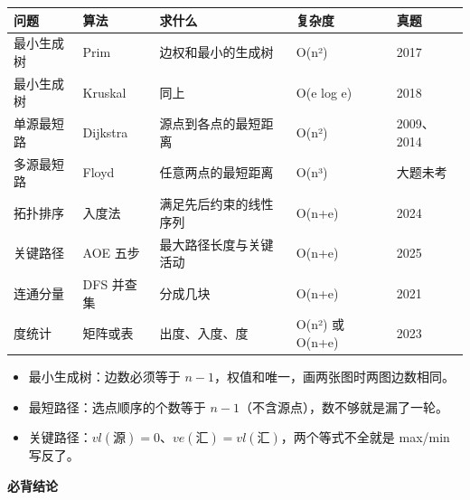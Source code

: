 \documentclass[10pt,a4paper]{ctexart}
\begin{document}
\begin{center}\small
\begin{tabularx}{\linewidth}{@{}ll>{\raggedright\arraybackslash}Xll@{}}
\toprule
问题 & 算法 & 求什么 & 复杂度 & 真题 \\
\midrule
最小生成树 & Prim & 边权和最小的生成树 & O(n²) & 2017 \\
最小生成树 & Kruskal & 同上 & O(e log e) & 2018 \\
单源最短路 & Dijkstra & 源点到各点的最短距离 & O(n²) & 2009、2014 \\
多源最短路 & Floyd & 任意两点的最短距离 & O(n³) & 大题未考 \\
拓扑排序 & 入度法 & 满足先后约束的线性序列 & O(n+e) & 2024 \\
关键路径 & AOE 五步 & 最大路径长度与关键活动 & O(n+e) & 2025 \\
连通分量 & DFS 并查集 & 分成几块 & O(n+e) & 2021 \\
度统计 & 矩阵或表 & 出度、入度、度 & O(n²) 或 O(n+e) & 2023 \\
\bottomrule
\end{tabularx}
\end{center}


\begin{itemize}

\item 最小生成树：边数必须等于 $n-1$，权值和唯一，画两张图时两图边数相同。

\item 最短路径：选点顺序的个数等于 $n-1$（不含源点），数不够就是漏了一轮。

\item 关键路径：$vl(\text{源})=0$、$ve(\text{汇})=vl(\text{汇})$，两个等式不全就是 max/min 写反了。

\end{itemize}






\textbf{必背结论}
\end{document}
